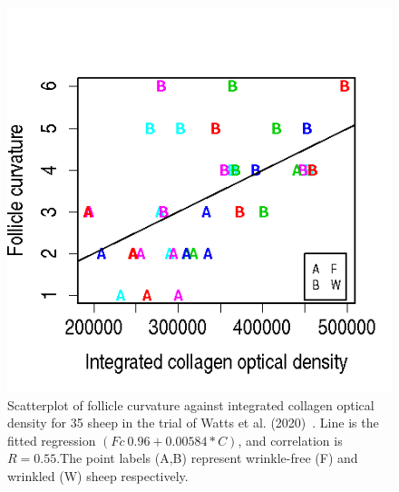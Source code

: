 %

\begin{figure}[]
\centering
    \includegraphics[scale=0.60]{fccoll.png}
  \caption{Scatterplot of follicle curvature against integrated collagen optical density for 35 sheep in the trial of Watts et al. (2020)~\cite{watts-2020}. Line is the fitted regression $(Fc ~ 0.96 + 0.00584 * C)$, and correlation is  $R=0.55$.The point labels (A,B) represent wrinkle-free (F) and wrinkled (W) sheep respectively. }
\vfill
  \label{fig:fccoll}
\end{figure}

%

